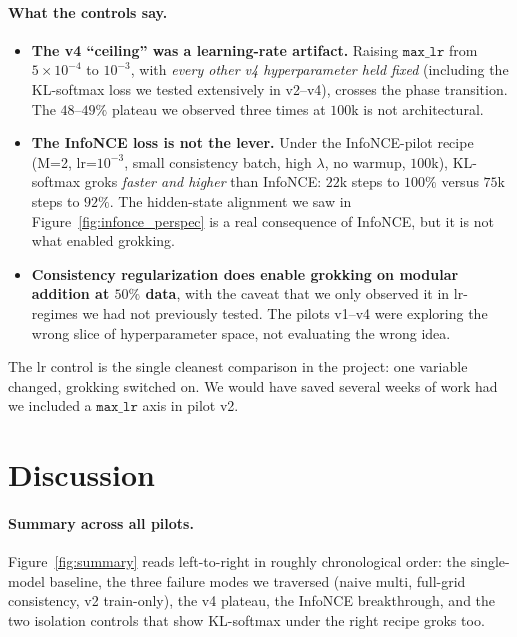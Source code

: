 \documentclass[11pt,a4paper]{article}
\begin{document}
\paragraph{What the controls say.}

\begin{itemize}[leftmargin=*,itemsep=1pt]
  \item \textbf{The v4 ``ceiling'' was a learning-rate artifact.}
        Raising $\mathtt{max\_lr}$ from $5{\times}10^{-4}$ to $10^{-3}$,
        with \emph{every other v4 hyperparameter held fixed} (including
        the KL-softmax loss we tested extensively in v2--v4), crosses
        the phase transition. The $48$--$49\%$ plateau we observed
        three times at $100$k is not architectural.
  \item \textbf{The InfoNCE loss is not the lever.} Under the
        InfoNCE-pilot recipe (M=2, lr=$10^{-3}$, small consistency
        batch, high $\lambda$, no warmup, $100$k), KL-softmax groks
        \emph{faster and higher} than InfoNCE: $22$k steps to $100\%$
        versus $75$k steps to $92\%$. The hidden-state alignment we
        saw in Figure~\ref{fig:infonce_perspec} is a real
        consequence of InfoNCE, but it is not what enabled grokking.
  \item \textbf{Consistency regularization does enable grokking on
        modular addition at $50\%$ data}, with the caveat that we only
        observed it in lr-regimes we had not previously tested. The
        pilots v1--v4 were exploring the wrong slice of hyperparameter
        space, not evaluating the wrong idea.
\end{itemize}

The lr control is the single cleanest comparison in the project: one
variable changed, grokking switched on. We would have saved several
weeks of work had we included a $\mathtt{max\_lr}$ axis in pilot v2.

\section{Discussion}
\label{sec:discussion}

\paragraph{Summary across all pilots.}
Figure~\ref{fig:summary} reads left-to-right in roughly chronological
order: the single-model baseline, the three failure modes we traversed
(naive multi, full-grid consistency, v2 train-only), the v4 plateau,
the InfoNCE breakthrough, and the two isolation controls that show
KL-softmax under the right recipe groks too.
\end{document}

